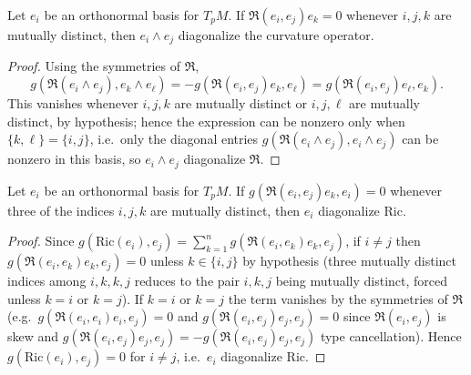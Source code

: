 \begin{proposition}
  \label{prop:pet-ch4-triple-vanishing-diagonalizes-operator}
  \leanok
  Let $e_i$ be an orthonormal basis for $T_pM$. If $\mathfrak{R}(e_i,e_j)e_k=0$ whenever
  $i,j,k$ are mutually distinct, then $e_i\wedge e_j$ diagonalize the curvature
  operator.
\end{proposition}
\begin{proof}
  \leanok
  Using the symmetries of $\mathfrak{R}$,
  \[
    g(\mathfrak{R}(e_i\wedge e_j),e_k\wedge e_\ell)
    =-g(\mathfrak{R}(e_i,e_j)e_k,e_\ell)=g(\mathfrak{R}(e_i,e_j)e_\ell,e_k).
  \]
  This vanishes whenever $i,j,k$ are mutually distinct or $i,j,\ell$ are mutually
  distinct, by hypothesis; hence the expression can be nonzero only when
  $\{k,\ell\}=\{i,j\}$, i.e.\ only the diagonal entries
  $g(\mathfrak{R}(e_i\wedge e_j),e_i\wedge e_j)$ can be nonzero in this basis, so
  $e_i\wedge e_j$ diagonalize $\mathfrak{R}$.
\end{proof}

\begin{proposition}
  \label{prop:pet-ch4-ricci-diagonal-criterion}
  \leanok
  Let $e_i$ be an orthonormal basis for $T_pM$. If $g(\mathfrak{R}(e_i,e_j)e_k,e_i)=0$
  whenever three of the indices $i,j,k$ are mutually distinct, then $e_i$
  diagonalize $\mathrm{Ric}$.
\end{proposition}
\begin{proof}
  \leanok
  Since $g(\mathrm{Ric}(e_i),e_j)=\sum_{k=1}^ng(\mathfrak{R}(e_i,e_k)e_k,e_j)$, if $i\ne j$
  then $g(\mathfrak{R}(e_i,e_k)e_k,e_j)=0$ unless $k\in\{i,j\}$ by hypothesis (three
  mutually distinct indices among $i,k,k,j$ reduces to the pair $i,k,j$ being
  mutually distinct, forced unless $k=i$ or $k=j$). If $k=i$ or $k=j$ the term
  vanishes by the symmetries of $\mathfrak{R}$ (e.g.\ $g(\mathfrak{R}(e_i,e_i)e_i,e_j)=0$ and
  $g(\mathfrak{R}(e_i,e_j)e_j,e_j)=0$ since $\mathfrak{R}(e_i,e_j)$ is skew and
  $g(\mathfrak{R}(e_i,e_j)e_j,e_j)=-g(\mathfrak{R}(e_i,e_j)e_j,e_j)$ type cancellation).
  Hence $g(\mathrm{Ric}(e_i),e_j)=0$ for $i\ne j$, i.e.\ $e_i$ diagonalize
  $\mathrm{Ric}$.
\end{proof}

